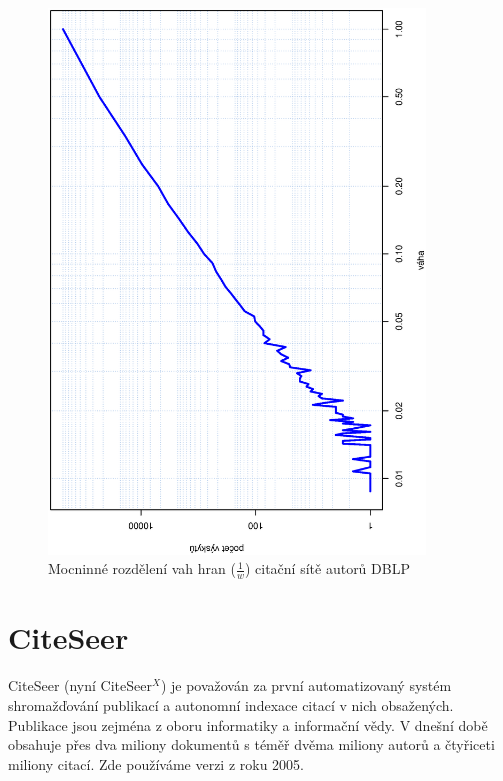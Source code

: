 \documentclass{bakalarka}
\begin{document}
\begin{figure}[!ht]
\centering
	\includegraphics[width=10cm,angle=270]{ewd_dblp.eps}
	\caption{Mocninné rozdělení vah hran ($\frac{1}{w}$) citační sítě autorů DBLP}
	\label{fig:scalefreedblp}
\end{figure}


\section{CiteSeer}
CiteSeer (nyní CiteSeer$^X$) \cite{citeseer} je považován za první
automatizovaný systém shromažďování publikací a autonomní indexace citací v
nich obsažených. Publikace jsou zejména z oboru informatiky a informační vědy.
V dnešní době obsahuje přes dva miliony dokumentů s téměř dvěma miliony autorů
a čtyřiceti miliony citací. Zde používáme verzi z roku 2005.
\end{document}
